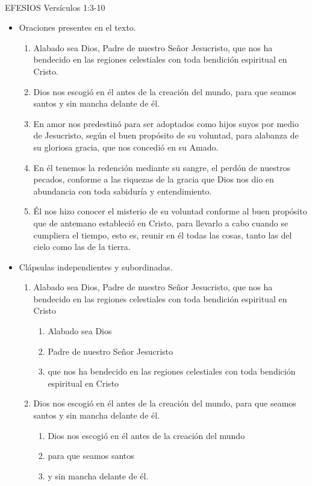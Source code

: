 \documentclass[11pt,letterpaper]{article}
\author{Ciencias}
\begin{document}
	\\
	{\large EFESIOS Versículos 1:3-10}\\
	
	\begin{itemize}
		\item {\large Oraciones presentes en el texto.}
		\begin{enumerate}
			\item Alabado sea Dios, Padre de nuestro Señor Jesucristo, que nos ha bendecido en las regiones celestiales con toda bendición espiritual en Cristo.
			\item Dios nos escogió en él antes de la creación del mundo, para que seamos santos y sin mancha delante de él.
			\item En amor nos predestinó para ser adoptados como hijos suyos por medio de Jesucristo, según el buen propósito de su voluntad, para alabanza de su gloriosa gracia, que nos concedió en su Amado.
			\item En él tenemos la redención mediante su sangre, el perdón de nuestros pecados, conforme a las riquezas de la gracia que Dios nos dio en abundancia con toda sabiduría y entendimiento.
			\item Él nos hizo conocer el misterio de su voluntad conforme al buen propósito que de antemano estableció en Cristo, para llevarlo a cabo cuando se cumpliera el tiempo, esto es, reunir en él todas las cosas, tanto las del cielo como las de la tierra.
		\end{enumerate}
		\item {\large Clápsulas independientes y subordinadas.} 
		\begin{enumerate}
			\item Alabado sea Dios, Padre de nuestro Señor Jesucristo, que nos ha bendecido en las regiones celestiales con toda bendición espiritual en Cristo
			\begin{enumerate}
				\item Alabado sea Dios
				\item Padre de nuestro Señor Jesucristo
				\item que nos ha bendecido en las regiones celestiales con toda bendición espiritual en Cristo
			\end{enumerate}
			\item Dios nos escogió en él antes de la creación del mundo, para que seamos santos y sin mancha delante de él.
			\begin{enumerate}
				\item Dios nos escogió en él antes de la creación del mundo
				\item para que seamos santos
				\item y sin mancha delante de él.
			\end{enumerate}
		\end{enumerate}
	\end{itemize}

	
	
\end{document}
